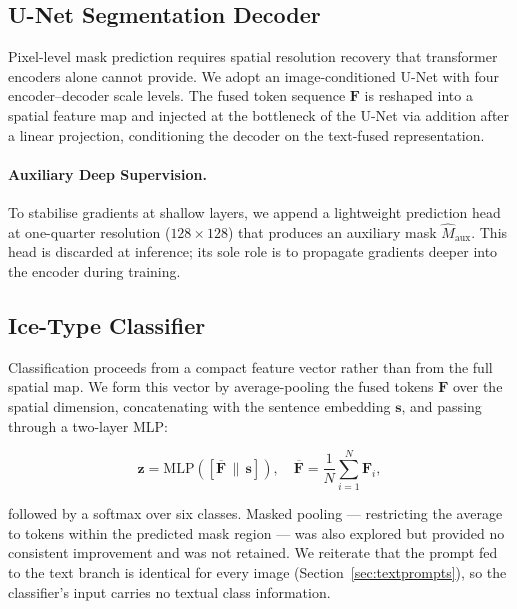 \documentclass[remotesensing,article,accept,moreauthors,pdftex]{Definitions/mdpi}
\begin{document}
\subsection{U-Net Segmentation Decoder}
\label{sec:decoder}

Pixel-level mask prediction requires spatial resolution recovery that
transformer encoders alone cannot provide. We adopt an image-conditioned U-Net
\cite{ronneberger2015unet} with four encoder--decoder scale levels. The fused
token sequence $\mathbf{F}$ is reshaped into a spatial feature map and
injected at the bottleneck of the U-Net via addition after a linear
projection, conditioning the decoder on the text-fused representation.

\paragraph{Auxiliary Deep Supervision.}
To stabilise gradients at shallow layers, we append a lightweight prediction
head at one-quarter resolution ($128 \times 128$) that produces an auxiliary
mask $\hat{M}_{\text{aux}}$. This head is discarded at inference; its sole
role is to propagate gradients deeper into the encoder during training.

\subsection{Ice-Type Classifier}
\label{sec:classifier}

Classification proceeds from a compact feature vector rather than from the full
spatial map. We form this vector by average-pooling the fused tokens
$\mathbf{F}$ over the spatial dimension, concatenating with the sentence
embedding $\mathbf{s}$, and passing through a two-layer MLP:

\begin{equation}
  \mathbf{z} = \text{MLP}\!\left(\left[\overline{\mathbf{F}} \,\|\, \mathbf{s}\right]\right),
  \quad \overline{\mathbf{F}} = \frac{1}{N}\sum_{i=1}^{N} \mathbf{F}_i,
  \label{eq:classifier_input}
\end{equation}

\noindent followed by a softmax over six classes. Masked pooling — restricting
the average to tokens within the predicted mask region — was also explored but
provided no consistent improvement and was not retained. We reiterate that the
prompt fed to the text branch is identical for every image
(Section~\ref{sec:textprompts}), so the classifier's input carries no textual
class information.
\end{document}
